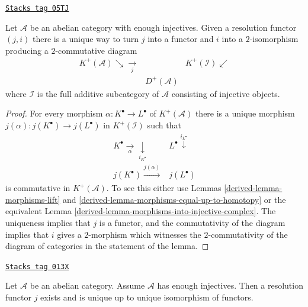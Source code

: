 \begin{lemma}
\label{derived-lemma-resolution-functor}
\href{https://stacks.math.columbia.edu/tag/05TJ}{\texttt{Stacks tag 05TJ}}

Let $\mathcal{A}$ be an abelian category with enough injectives.
Given a resolution functor $(j, i)$ there is a unique way to
turn $j$ into a functor and $i$ into a $2$-isomorphism
producing a $2$-commutative diagram
$$
\begin{array}{ccc}K^{+}(\mathcal{A}) \searrow\underset{j}{\longrightarrow} &  & K^{+}(\mathcal{I}) \swarrow \\  & D^{+}(\mathcal{A}) & \end{array}
$$
where $\mathcal{I}$ is the full additive subcategory of $\mathcal{A}$
consisting of injective objects.
\end{lemma}

\begin{proof}

For every morphism $\alpha : K^\bullet \to L^\bullet$ of $K^{+}(\mathcal{A})$
there is a unique morphism
$j(\alpha) : j(K^\bullet) \to j(L^\bullet)$ in $K^{+}(\mathcal{I})$
such that
$$
\begin{array}{cc}K^\bullet \underset{\alpha}{\longrightarrow}\underset{i_{K^\bullet}}{\downarrow} & L^\bullet \overset{i_{L^\bullet}}{\downarrow} \\ j(K^\bullet) \overset{j(\alpha)}{\longrightarrow} & j(L^\bullet)\end{array}
$$
is commutative in $K^{+}(\mathcal{A})$. To see this either use
Lemmas \ref{derived-lemma-morphisms-lift} and
\ref{derived-lemma-morphisms-equal-up-to-homotopy}
or the equivalent
Lemma \ref{derived-lemma-morphisms-into-injective-complex}.
The uniqueness implies that $j$ is a functor, and the commutativity of
the diagram implies that $i$ gives a $2$-morphism which witnesses the
$2$-commutativity of the diagram of categories in the statement of
the lemma.
\end{proof}

\begin{lemma}
\label{derived-lemma-into-derived-category}
\href{https://stacks.math.columbia.edu/tag/013X}{\texttt{Stacks tag 013X}}

Let $\mathcal{A}$ be an abelian category.
Assume $\mathcal{A}$ has enough injectives.
Then a resolution functor $j$ exists and is
unique up to unique isomorphism of functors.
\end{lemma}

